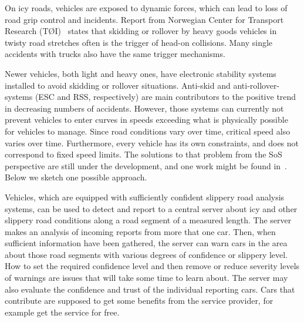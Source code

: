 On icy roads, vehicles are exposed to dynamic forces, which can lead to loss of road grip control and incidents. Report from Norwegian Center for Transport Research (T{{\O{}}}I)~\cite{PerAndreas} states that skidding or rollover by heavy goods vehicles in twisty road stretches often is the trigger of head-on collisions. Many single accidents with trucks also have the same trigger mechanisms.

Newer vehicles, both light and heavy ones, have electronic stability systems installed to avoid skidding or rollover situations. Anti-skid and anti-rollover-systems (ESC and RSS, respectively) are main contributors to the positive trend in decreasing numbers of accidents. However, those systems can currently not prevent vehicles to enter curves in speeds exceeding what is physically possible for vehicles to manage. Since
road conditions vary over time, critical speed also varies over time. Furthermore, every vehicle has its own constraints, and does not correspond to fixed speed limits. The solutions to that problem from the SoS perspective are still under the development, and one work might be found in~\cite{PerAndreas}. Below we sketch one possible approach.

Vehicles, which are equipped with sufficiently confident slippery road analysis systems, can be used to detect and report to a central server about icy and other slippery road conditions along a road segment of a measured length. The server makes an analysis of incoming reports from more that one car. Then, when sufficient information have been gathered, the server can warn cars in the area about those road segments with various degrees of confidence or slippery level. How to set the required confidence level and then remove or reduce severity levels of warnings are issues that will take some time to learn about. The server may also evaluate the confidence and trust of the individual reporting cars. Cars that contribute are supposed to get some benefits from the service provider, for example get the service for free.

